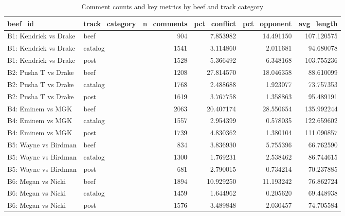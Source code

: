 \begin{table}
\caption{Comment counts and key metrics by beef and track category}
\label{tab:table1_summary}
\begin{tabular}{llrrrr}
\toprule
beef\_id & track\_category & n\_comments & pct\_conflict & pct\_opponent & avg\_length \\
\midrule
B1: Kendrick vs Drake & beef & 904 & 7.853982 & 14.491150 & 107.120575 \\
B1: Kendrick vs Drake & catalog & 1541 & 3.114860 & 2.011681 & 94.680078 \\
B1: Kendrick vs Drake & post & 1528 & 5.366492 & 6.348168 & 103.755236 \\
B2: Pusha T vs Drake & beef & 1208 & 27.814570 & 18.046358 & 88.610099 \\
B2: Pusha T vs Drake & catalog & 1768 & 2.488688 & 1.923077 & 73.757353 \\
B2: Pusha T vs Drake & post & 1619 & 3.767758 & 1.358863 & 95.489191 \\
B4: Eminem vs MGK & beef & 2063 & 20.407174 & 28.550654 & 135.992244 \\
B4: Eminem vs MGK & catalog & 1557 & 2.954399 & 0.578035 & 122.659602 \\
B4: Eminem vs MGK & post & 1739 & 4.830362 & 1.380104 & 111.090857 \\
B5: Wayne vs Birdman & beef & 834 & 3.836930 & 5.755396 & 66.762590 \\
B5: Wayne vs Birdman & catalog & 1300 & 1.769231 & 2.538462 & 86.744615 \\
B5: Wayne vs Birdman & post & 681 & 2.790015 & 0.734214 & 70.237885 \\
B6: Megan vs Nicki & beef & 1894 & 10.929250 & 11.193242 & 76.862724 \\
B6: Megan vs Nicki & catalog & 1459 & 1.644962 & 0.205620 & 69.448938 \\
B6: Megan vs Nicki & post & 1576 & 3.489848 & 2.030457 & 74.705584 \\
\bottomrule
\end{tabular}
\end{table}
